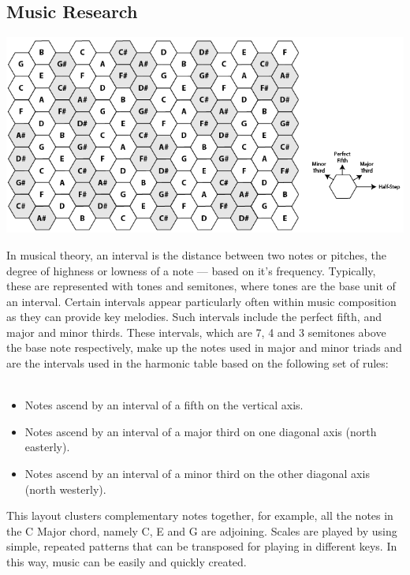 \documentclass[10pt,a4paper]{article}
\begin{document}
\subsection{Music Research}
\begin{center}
\includegraphics[scale=0.5]{5.png}
\end{center}
In musical theory, an interval is the distance between two notes or pitches, the degree of highness or lowness of a note --- based on it's frequency. Typically, these are represented with tones and semitones, where tones are the base unit of an interval. Certain intervals appear particularly often within music composition as they can provide key melodies. Such intervals include the perfect fifth, and major and minor thirds. These intervals, which are 7, 4 and 3 semitones above the base note respectively, make up the notes used in major and minor triads and are the intervals used in the harmonic table based on the following set of rules:\\
\\
\begin{itemize}
\item Notes ascend by an interval of a fifth on the vertical axis.
\item Notes ascend by an interval of a major third on one diagonal axis (north easterly).
\item Notes ascend by an interval of a minor third on the other diagonal axis (north westerly).
\end{itemize}
This layout clusters complementary notes together, for example, all the notes in the C Major chord, namely C, E and G are adjoining. Scales are played by using simple, repeated patterns that can be transposed for playing in different keys. In this way, music can be easily and quickly created.\\
\end{document}

